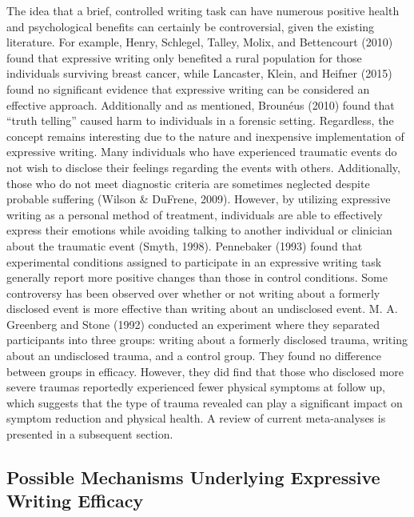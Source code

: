 \documentclass[english,man, mask]{apa6}
\theoremstyle{definition}
\theoremstyle{definition}
\theoremstyle{definition}
\theoremstyle{remark}
\begin{document}
The idea that a brief, controlled writing task can have numerous
positive health and psychological benefits can certainly be
controversial, given the existing literature. For example, Henry,
Schlegel, Talley, Molix, and Bettencourt (2010) found that expressive
writing only benefited a rural population for those individuals
surviving breast cancer, while Lancaster, Klein, and Heifner (2015)
found no significant evidence that expressive writing can be considered
an effective approach. Additionally and as mentioned, Brounéus (2010)
found that \enquote{truth telling} caused harm to individuals in a
forensic setting. Regardless, the concept remains interesting due to the
nature and inexpensive implementation of expressive writing. Many
individuals who have experienced traumatic events do not wish to
disclose their feelings regarding the events with others. Additionally,
those who do not meet diagnostic criteria are sometimes neglected
despite probable suffering (Wilson \& DuFrene, 2009). However, by
utilizing expressive writing as a personal method of treatment,
individuals are able to effectively express their emotions while
avoiding talking to another individual or clinician about the traumatic
event (Smyth, 1998). Pennebaker (1993) found that experimental
conditions assigned to participate in an expressive writing task
generally report more positive changes than those in control conditions.
Some controversy has been observed over whether or not writing about a
formerly disclosed event is more effective than writing about an
undisclosed event. M. A. Greenberg and Stone (1992) conducted an
experiment where they separated participants into three groups: writing
about a formerly disclosed trauma, writing about an undisclosed trauma,
and a control group. They found no difference between groups in
efficacy. However, they did find that those who disclosed more severe
traumas reportedly experienced fewer physical symptoms at follow up,
which suggests that the type of trauma revealed can play a significant
impact on symptom reduction and physical health. A review of current
meta-analyses is presented in a subsequent section.

\subsection{Possible Mechanisms Underlying Expressive Writing
Efficacy}\label{possible-mechanisms-underlying-expressive-writing-efficacy}
\end{document}
